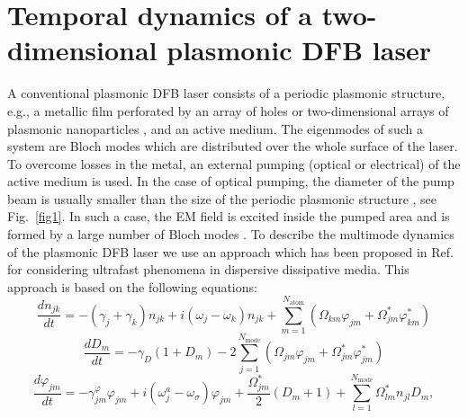 \documentclass[aps,prapplied,amsmath,amssymb,onecolumn,superscriptaddress,showpacs,floatfix,longbibliography]{revtex4-1}
\begin{document}
\section*{Temporal dynamics of a two-dimensional plasmonic DFB laser}
A conventional plasmonic DFB laser consists of a periodic plasmonic structure, e.g., a metallic film perforated by an array of holes \cite{BeijnumPRL,DorofeenkoOptExp,MengLPR,nefedkin2018acsphot,TennerJOpt,TennerACSPhot,Zyablovsky2017Optimum,Melentiev2017nanolaser} or two-dimensional arrays of plasmonic nanoparticles \cite{ZhouNatNano,SchokkerPRB,daskalakis2018nanolett,SchokkerACSPhot,YangNatComm,YangACSNano,hakala2017lasing,wang2017band}, and an active medium.
The eigenmodes of such a system are Bloch modes which are distributed over the whole surface of the laser.
To overcome losses in the metal, an external pumping (optical or electrical) of the active medium is used.
In the case of optical pumping, the diameter of the pump beam is usually smaller than the size of the periodic plasmonic structure \cite{TennerACSPhot,ZhouNatNano,daskalakis2018nanolett}, see Fig.~\ref{fig1}.
In such a case, the EM field is excited inside the pumped area and is formed by a large number of Bloch modes \cite{TennerACSPhot,nefedkin2018acsphot}.
To describe the multimode dynamics of the plasmonic DFB laser we use an approach which has been proposed in Ref. \cite{Zyablovsky2017approach} for considering ultrafast phenomena in dispersive dissipative media.
This approach is based on the following equations:
\begin{equation}\label{eq1}
\frac{{d{n_{jk}}}}{{dt}} =  - \left( {{\gamma _j} + {\gamma _k}} \right){n_{jk}} + i\left( {{\omega _j} - {\omega _k}} \right){n_{jk}} + \sum\limits_{m=1}^{N_{\text{atom}}} {\left( {{\Omega _{km}}{\varphi _{jm}} + \Omega _{jm}^*\varphi _{km}^*} \right)} 
\end{equation}
\begin{equation}\label{eq2}
\frac{{d{D_m}}}{{dt}} =  - {\gamma _D}\left( {1 + {D_m}} \right)  - 2\sum\limits_{j=1}^{N_{\text{mode}}} {\left( {{\Omega _{jm}}{\varphi _{jm}} + \Omega _{jm}^*\varphi _{jm}^*} \right)} 
\end{equation}
\begin{equation}\label{eq3}
\frac{{d{\varphi _{jm}}}}{{dt}} =  -\gamma_{jm}^{\varphi} {\varphi _{jm}} + i\left( {{\omega _j^a} - {\omega _\sigma }} \right){\varphi _{jm}} + \frac{{\Omega _{jm}^*}}{2}\left( {{D_m} + 1} \right) + \sum\limits_{l=1}^{N_{\text{mode}}} {\Omega _{lm}^*{n_{jl}}{D_m}} , 
\end{equation}
\end{document}
